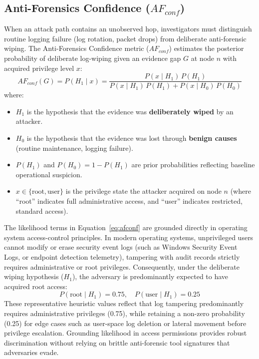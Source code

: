 \documentclass[12pt]{article}
\begin{document}
\subsection{Anti-Forensics Confidence (\texorpdfstring{$AF_{conf}$}{AF\_conf})}\label{sec:afconf}

When an attack path contains an unobserved hop, investigators must distinguish routine logging failure (log rotation, packet drops) from deliberate anti-forensic wiping. The Anti-Forensics Confidence metric ($AF_{conf}$) estimates the posterior probability of deliberate log-wiping given an evidence gap $G$ at node $n$ with acquired privilege level $x$:
\begin{equation}\label{eq:afconf}
AF_{conf}(G) = P(H_1 \mid x) = \frac{P(x \mid H_1)\,P(H_1)}{P(x \mid H_1)\,P(H_1) + P(x \mid H_0)\,P(H_0)}
\end{equation}
where:
\begin{itemize}
    \item $H_1$ is the hypothesis that the evidence was \textbf{deliberately wiped} by an attacker.
    \item $H_0$ is the hypothesis that the evidence was lost through \textbf{benign causes} (routine maintenance, logging failure).
    \item $P(H_1)$ and $P(H_0) = 1 - P(H_1)$ are prior probabilities reflecting baseline operational suspicion.
    \item $x \in \{\text{root}, \text{user}\}$ is the privilege state the attacker acquired on node $n$ (where ``root'' indicates full administrative access, and ``user'' indicates restricted, standard access).
\end{itemize}

The likelihood terms in Equation~\ref{eq:afconf} are grounded directly in operating system access-control principles. In modern operating systems, unprivileged users cannot modify or erase security event logs (such as Windows Security Event Logs, or endpoint detection telemetry), tampering with audit records strictly requires administrative or root privileges. Consequently, under the deliberate wiping hypothesis ($H_1$), the adversary is predominantly expected to have acquired root access:
\begin{equation}
P(\text{root} \mid H_1) = 0.75, \quad P(\text{user} \mid H_1) = 0.25
\end{equation}
These representative heuristic values reflect that log tampering predominantly requires administrative privileges (0.75), while retaining a non-zero probability (0.25) for edge cases such as user-space log deletion or lateral movement before privilege escalation. Grounding likelihood in access permissions provides robust discrimination without relying on brittle anti-forensic tool signatures that adversaries evade.
\end{document}
